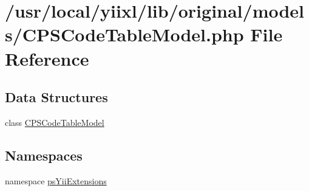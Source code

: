 \hypertarget{CPSCodeTableModel_8php}{
\section{/usr/local/yiixl/lib/original/models/CPSCodeTableModel.php File Reference}
\label{CPSCodeTableModel_8php}
}
\subsection*{Data Structures}
\begin{DoxyCompactItemize}
\item 
class \hyperlink{classCPSCodeTableModel}{CPSCodeTableModel}
\end{DoxyCompactItemize}
\subsection*{Namespaces}
\begin{DoxyCompactItemize}
\item 
namespace \hyperlink{namespacepsYiiExtensions}{psYiiExtensions}
\end{DoxyCompactItemize}
